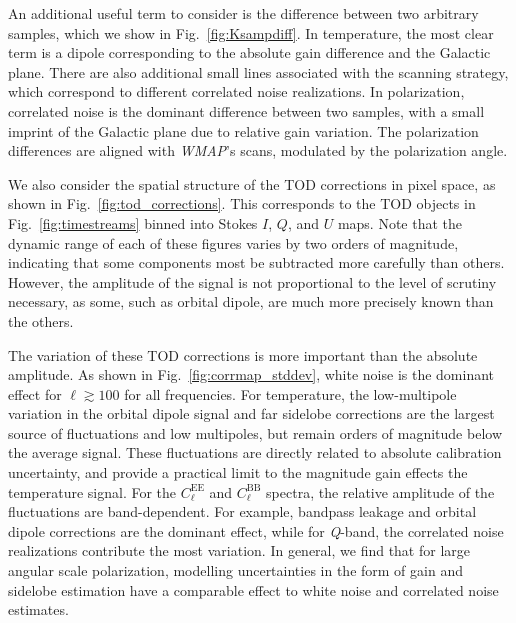 \documentclass[twocolumn]{../../common/aa}
\def\WMAP{\emph{WMAP}}
\newcommand{\Q}[0]{\textit Q}
\newcommand{\data}{\vec d}
\begin{document}
An additional useful term to consider is the difference between two arbitrary samples, which we show in Fig.~\ref{fig:Ksampdiff}. In temperature, the most clear term is a dipole corresponding to the absolute gain difference and the Galactic plane. There are also additional small lines associated with the scanning strategy, which correspond to different correlated noise realizations. In polarization, correlated noise is the dominant difference between two samples, with a small imprint of the Galactic plane due to relative gain variation. The polarization differences are aligned with \WMAP's scans, modulated by the polarization angle.

We also consider the spatial structure of the TOD corrections in pixel space, as shown in Fig.~\ref{fig:tod_corrections}. This corresponds to the TOD objects in Fig.~\ref{fig:timestreams} binned into Stokes $I$, $Q$, and $U$ maps. Note that the dynamic range of each of these figures varies by two orders of magnitude, indicating that some components most be subtracted more carefully than others. However, the amplitude of the signal is not proportional to the level of scrutiny necessary, as some, such as orbital dipole, are much more precisely known than the others. 

The variation of these TOD corrections is more important than the absolute amplitude. As shown in Fig.~\ref{fig:corrmap_stddev}, white noise is the dominant effect for $\ell\gtrsim100$ for all frequencies. For temperature, the low-multipole variation in the orbital dipole signal and far sidelobe corrections are the largest source of fluctuations and low multipoles, but remain orders of magnitude below the average signal. These fluctuations are directly related to absolute calibration uncertainty, and provide a practical limit to the magnitude gain effects the temperature signal. For the $C_\ell^\mathrm{EE}$ and $C_\ell^\mathrm{BB}$ spectra, the relative amplitude of the fluctuations are band-dependent. For example, bandpass leakage and orbital dipole corrections are the dominant effect, while for \Q-band, the correlated noise realizations contribute the most variation. In general, we find that for large angular scale polarization, modelling uncertainties in the form of gain and sidelobe estimation have a comparable effect to white noise and correlated noise estimates.



\end{document}
